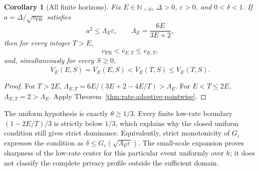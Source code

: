 \documentclass[11pt]{article}
\newtheorem{corollary}[theorem]{Corollary}
\theoremstyle{remark}
\newcommand{\N}{\mathbb N}
\begin{document}
\begin{corollary}[All finite horizons]\label{cor:fixed-epoch-all-horizon}
Fix $E\in\N_{>0}$, $\Delta>0$, $\varepsilon>0$, and $0<\delta<1$.
If $a=\Delta/\sqrt{v_{\mathrm{FB}}}$ satisfies
\begin{equation}\label{eq:epoch-uniform-condition}
 a^2\leq\Lambda_E\varepsilon,\qquad \Lambda_E=\frac{6E}{3E+2},
\end{equation}
then for every integer $T>E$,
\[
 v_{\mathrm{FB}}<\overline v_{E,T}\leq v_{E,T},
\]
and, simultaneously for every $S\geq0$,
\[
 V_E(E,S)=\overline V_E(E,S)<\overline V_E(T,S)\leq V_E(T,S).
\]
\end{corollary}
\begin{proof}
For $T>2E$, $\Lambda_{E,T}=6E/(3E+2-4E/T)>\Lambda_E$.
For $E<T\leq2E$, $\Lambda_{E,T}=2>\Lambda_E$.
Apply Theorem~\ref{thm:rate-adaptive-pointwise}.
\end{proof}
The uniform hypothesis is exactly $\theta\geq1/3$. Every finite low-rate
boundary $(1-2E/T)/3$ is strictly below $1/3$, which explains why the closed
uniform condition still gives strict dominance. Equivalently, strict
monotonicity of $G_\varepsilon$ expresses the condition as
$\delta\leq G_\varepsilon(\sqrt{\Lambda_E\varepsilon})$.
The small-scale expansion proves sharpness of the low-rate center for this
particular event uniformly over $h$; it does not classify the complete
privacy profile outside the sufficient domain.
\end{document}
